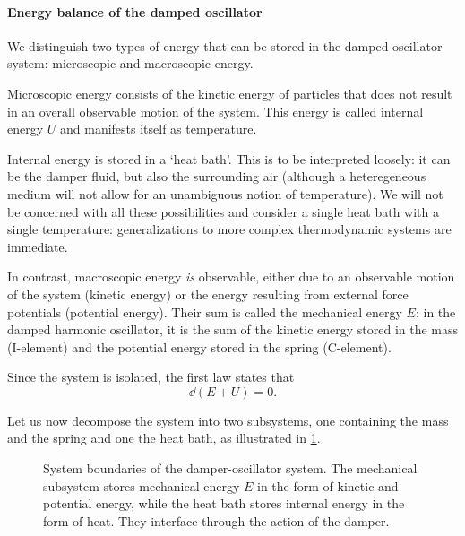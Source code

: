 \paragraph{Energy balance of the damped oscillator} We distinguish two types of energy that can be stored in the damped oscillator system: microscopic and macroscopic energy.

Microscopic energy consists of the kinetic energy of particles that does not result in an overall observable motion of the system. This energy is called internal energy $U$ and manifests itself as temperature. 

Internal energy is stored in a `heat bath'. This is to be interpreted loosely: it can be the damper fluid, but also the surrounding air (although a heteregeneous medium will not allow for an unambiguous notion of temperature). We will not be concerned with all these possibilities and consider a single heat bath with a single temperature: generalizations to more complex thermodynamic systems are immediate. 

In contrast, macroscopic energy \emph{is} observable, either due to an observable motion of the system (kinetic energy) or the energy resulting from external force potentials (potential energy). Their sum is called the mechanical energy $E$: in the damped harmonic oscillator, it is the sum of the kinetic energy stored in the mass (I-element) and the potential energy stored in the spring (C-element).

Since the system is isolated, the first law states that 
\begin{equation}
    \dd{(E + U)} = 0. 
    \label{eq:dho_first_law}
\end{equation}

Let us now decompose the system into two subsystems, one containing the mass and the spring and one the heat bath, as illustrated in \cref{fig:oscillator_thermo}. 
\begin{figure}[ht!]
    \centering
    
    \caption{System boundaries of the damper-oscillator system. The mechanical subsystem stores mechanical energy $E$ in the form of kinetic and potential energy, while the heat bath stores internal energy in the form of heat. They interface through the action of the damper.}
    \label{fig:oscillator_thermo}
\end{figure}


